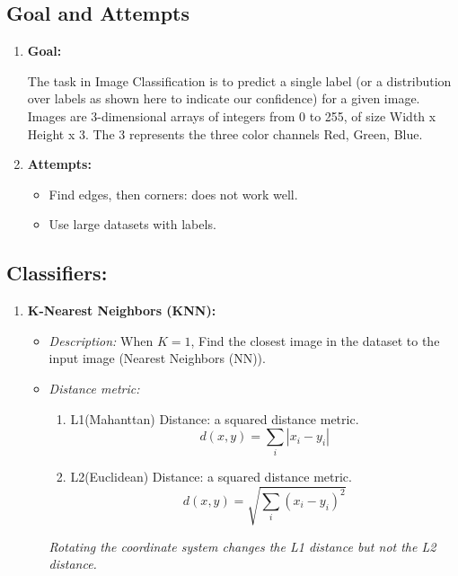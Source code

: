 \documentclass{article}
\numberwithin{equation}{section}
\begin{document}
\begin{CJK}{UTF8}{gbsn}
\subsection{Goal and Attempts}
    \begin{enumerate}
        \item \textbf{Goal:}\par
        The task in Image Classification is to predict a single label (or a distribution over labels as shown here to indicate our confidence) for a given image. Images are 3-dimensional arrays of integers from 0 to 255, of size Width x Height x 3. The 3 represents the three color channels Red, Green, Blue.\par
        \item \textbf{Attempts:}
        \begin{itemize}
            \item Find edges, then corners: does not work well.
            \item Use large datasets with labels.
        \end{itemize}
    \end{enumerate}


\subsection{Classifiers:}
    \begin{enumerate}
        \item \textbf{K-Nearest Neighbors (KNN):}
        \begin{itemize}
            \item \textit{Description:} When \(K = 1\), Find the closest image in the dataset to the input image (Nearest Neighbors (NN)).
            \item \textit{Distance metric:}
            \begin{enumerate} 
                \item L1(Mahanttan) Distance: a squared distance metric.
                \begin{equation}
                    d(x,y) = \sum_i |x_i - y_i|
                \end{equation}
        
                \item L2(Euclidean) Distance: a squared distance metric.
                \begin{equation}
                    d(x,y) = \sqrt{\sum_i (x_i - y_i)^2}
                \end{equation}
            \end{enumerate}
            \textit{Rotating the coordinate system changes the L1 distance but not the L2 distance.}
            

\end{itemize}
\end{enumerate}
\end{CJK}
\end{document}
